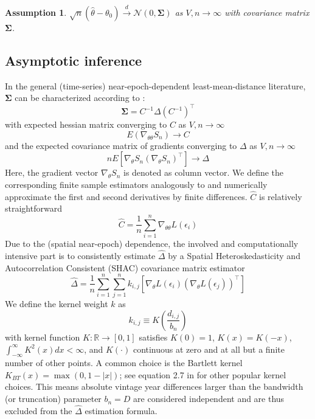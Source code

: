 \documentclass[12pt]{article}
\newtheorem{assume}{Assumption}
\begin{document}
\begin{assume}
	$\sqrt{n}(\hat{\theta} - \theta_0) \overset{d}{\to} \mathcal{N}(0,\mathbf{\Sigma})$ as $V,n \to \infty$ with covariance matrix $\mathbf{\Sigma}$.
\end{assume}

\subsection{Asymptotic inference}
\label{sec:asymptotic_inference}

In the general (time-series) near-epoch-dependent least-mean-distance literature, $\mathbf{\Sigma}$ can be characterized according to \citet[Theorem 11.2.b, Theorem H.1]{PP97}:
\[
\mathbf{\Sigma} = C^{-1} \Delta (C^{-1})^\top
\]
with expected hessian matrix converging to $C$ as $V,n \to \infty$
\[
E 
\left(
\nabla_{\theta \theta} S_n
\right)
\to C
\]
and the expected covariance matrix of gradients converging to $\Delta$ as $V,n \to \infty$
\[
n E 
\left[
\nabla_{\theta} S_n
(\nabla_{\theta} S_n)^\top
\right]
\to \Delta
\]
Here, the gradient vector $\nabla_{\theta} S_n$ is denoted as column vector.
We define the corresponding finite sample estimators analogously to \citet[Chapters 12, 13.1]{PP97} and numerically approximate the first and second derivatives by finite differences. $\hat{C}$ is relatively straightforward
\[
\hat{C} = \frac{1}{n} \sum_{i=1}^n \nabla_{\theta \theta} L \left( \epsilon_i \right)
\]
Due to the (spatial near-epoch) dependence, the involved and computationally intensive part is to consistently estimate $\hat{\Delta}$ by a Spatial Heteroskedasticity and Autocorrelation Consistent (SHAC) covariance matrix estimator \cite[equation 2]{KS11}
\begin{equation}
\label{eq:hac}
\hat{\Delta} = \frac{1}{n} \sum_{i=1}^n \sum_{j=1}^n
k_{i,j}
\left[
\nabla_{\theta} L \left( \epsilon_i \right)
\left(
\nabla_{\theta} L \left( \epsilon_j \right)
\right)^\top
\right]
\end{equation}
We define the kernel weight $k$ as
\[
k_{i,j} \equiv K \left( \frac{d_{i,j}}{b_n} \right)
\]
with kernel function $K: \mathbb{R} \to [0,1]$ satisfies $K(0)=1$, $K(x)=K(-x)$, $\int_{-\infty}^{\infty} K^2(x) dx < \infty$, and $K(\cdot)$ continuous at zero and at all but a finite number of other points.
A common choice is the Bartlett kernel $K_{BT}(x)= \max(0, 1-|x|)$; see equation 2.7 in \cite{A91} for other popular kernel choices.
This means absolute vintage year differences larger than the bandwidth (or truncation) parameter $b_n=D$ are considered independent and are thus excluded from the $\hat{\Delta}$ estimation formula.
\end{document}
